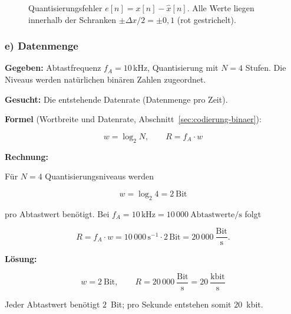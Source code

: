 \begin{beispiel}
\begin{figure}[H]
\centering
{}
\caption{Quantisierungsfehler $e[n] = x[n] - \hat{x}[n]$. Alle Werte liegen
innerhalb der Schranken $\pm\Delta x/2 = \pm 0{,}1$ (rot gestrichelt).}
\end{figure}

\end{beispiel}

\subsubsection*{e) Datenmenge}

\begin{beispiel}

\textbf{Gegeben:} Abtastfrequenz $f_A = 10\,\text{kHz}$, Quantisierung mit
$N = 4$ Stufen. Die Niveaus werden natürlichen binären Zahlen zugeordnet.

\textbf{Gesucht:} Die entstehende Datenrate (Datenmenge pro Zeit).

\textbf{Formel} (Wortbreite und Datenrate, Abschnitt~\ref{sec:codierung-binaer}):

$$
w = \log_2 N, \qquad R = f_A \cdot w
$$

\textbf{Rechnung:}

Für $N = 4$ Quantisierungsniveaus werden

$$
w = \log_2 4 = 2 \ \text{Bit}
$$

pro Abtastwert benötigt. Bei $f_A = 10\,\text{kHz} = 10\,000\ \text{Abtastwerte/s}$
folgt

$$
R = f_A \cdot w = 10\,000\,\text{s}^{-1} \cdot 2\,\text{Bit}
  = 20\,000\ \frac{\text{Bit}}{\text{s}}.
$$

\textbf{Lösung:}

$$
\boxed{\;w = 2\ \text{Bit}, \qquad R = 20\,000\ \frac{\text{Bit}}{\text{s}}
= 20\ \frac{\text{kbit}}{\text{s}}\;}
$$

Jeder Abtastwert benötigt $2$~Bit; pro Sekunde entstehen somit $20$~kbit.

\end{beispiel}

